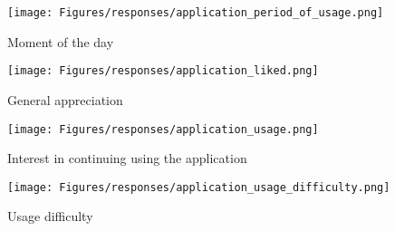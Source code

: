 \begin{figure}[!ht]
	\centering
	\begin{minipage}{.5\textwidth}
		\centering
		\texttt{[image: Figures/responses/application\_period\_of\_usage.png]}
		\caption{Moment of the day}
		\label{fig:application_period_of_usage}
	\end{minipage}%
	\begin{minipage}{.5\textwidth}
		\centering
		\texttt{[image: Figures/responses/application\_liked.png]}
		\caption{General appreciation}
		\label{fig:application_liked}
	\end{minipage}%
\end{figure}

\begin{figure}[!ht]
	\centering
	\begin{minipage}{.5\textwidth}
		\centering
		\texttt{[image: Figures/responses/application\_usage.png]}
		\caption{Interest in continuing using the application}
		\label{fig:application_usage}
	\end{minipage}%
	\begin{minipage}{.5\textwidth}
		\centering
		\texttt{[image: Figures/responses/application\_usage\_difficulty.png]}
		\caption{Usage difficulty}
		\label{fig:application_usage_difficulty}
	\end{minipage}
\end{figure}

